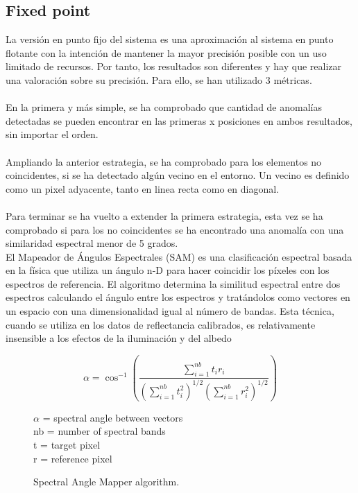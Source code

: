 \subsection{Fixed point}
La versión en punto fijo del sistema es una aproximación al sistema en punto flotante con la intención de mantener la mayor precisión posible con un uso limitado de recursos.
Por tanto, los resultados son diferentes y hay que realizar una valoración sobre su precisión. Para ello, se han utilizado 3 métricas.
\\
\\
En la primera y más simple, se ha comprobado que cantidad de anomalías detectadas se pueden encontrar en las primeras x posiciones en ambos resultados, sin importar el orden.
\\
\\
Ampliando la anterior estrategia, se ha comprobado para los elementos no coincidentes, si se ha detectado algún vecino en el entorno. Un vecino es definido como un pixel adyacente, tanto en linea recta como en diagonal.
\\
\\
Para terminar se ha vuelto a extender la primera estrategia, esta vez se ha comprobado si para los no coincidentes se ha encontrado una anomalía con una similaridad espectral menor de 5 grados.
\\
El Mapeador de Ángulos Espectrales (SAM) es una clasificación espectral basada en la física que utiliza un ángulo n-D para hacer coincidir los píxeles con los espectros de referencia. El algoritmo determina la similitud espectral entre dos espectros calculando el ángulo entre los espectros y tratándolos como vectores en un espacio con una dimensionalidad igual al número de bandas. Esta técnica, cuando se utiliza en los datos de reflectancia calibrados, es relativamente insensible a los efectos de la iluminación y del albedo
\begin{figure}[h!]
\begin{minipage}[t]{0.5\linewidth}
\centering
\[\alpha = \cos^{-1}\left ( \frac{\sum\limits^{nb}_{i=1}{t_{i}r_{i}}}{\left ( \sum\limits^{nb}_{i=1}{t_{i}^2} \right )^{1/2}\left ( \sum\limits^{nb}_{i=1}{r_{i}^2} \right )^{1/2}} \right )\]
\label{sam}
\end{minipage}
\begin{minipage}[t]{0.05\linewidth}
\end{minipage}
\begin{minipage}[t]{0.45\linewidth}
\vspace{0.7cm}
$\alpha$ = spectral angle between vectors
\\
nb = number of spectral bands
\\
t = target pixel
\\
r = reference pixel
\end{minipage}
\caption{Spectral Angle Mapper algorithm.}
\end{figure}


